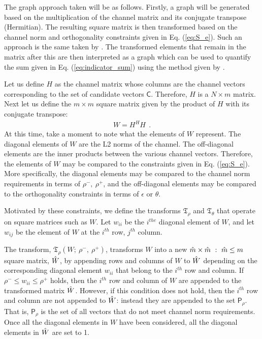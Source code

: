 The graph approach taken will be as follows. Firstly, a graph will be generated based on the multiplication of the channel matrix and its conjugate transpose (Hermitian). The resulting square matrix is then transformed based on the channel norm and orthogonality constraints given in Eq. (\ref{eq:S_e}). Such an approach is the same taken by \cite{SwannackThesis}. The transformed elements that remain in the matrix after this are then interpreted as a graph which can be used to quantify the sum given in Eq. (\ref{eq:indicator_sum}) using the method given by \cite{Janson2004}.

Let us define $H$ as the channel matrix whose columns are the channel vectors corresponding to the set of candidate vectors $\mathsf{C}$. Therefore, $H$ is a $N \times m$ matrix. Next let us define the $m \times m$ square matrix given by the product of $H$ with its conjugate transpose:
 \begin{equation}\label{eq:w_matrix}
    \begin{aligned}
        W = H^HH \ \ .
    \end{aligned}
\end{equation}
At this time, take a moment to note what the elements of $W$ represent. The diagonal elements of $W$ are the L2 norms of the channel. The off-diagonal elements are the inner products between the various channel vectors. Therefore, the elements of $W$ may be compared to the constraints given in Eq. (\ref{eq:S_e}). More specifically, the diagonal elements may be compared to the channel norm requirements in terms of $\rho^-,\ \rho^+$, and the off-diagonal elements may be compared to the orthogonality constraints in terms of $\epsilon$ or $\theta$.

Motivated by these constraints, we define the transforms $\mathfrak{T}_\rho$ and $\mathfrak{T}_\theta$ that operate on square matrices such as $W$. Let $w_{ii}$ be the $i^{the}$ diagonal element of $W$, and let $w_{ij}$ be the element of $W$ at the $i^{th}$ row, $j^{th}$ column.

The transform, $\mathfrak{T}_\rho(W;\ \rho^-, \ \rho^+)$, transforms $W$ into a new $\Hat{m}\times \Hat{m}\ : \ \Hat{m}\leq m$ square matrix, $\Hat{W}$, by appending rows and columns of $W$ to $\Hat{W}$ depending on the corresponding diagonal element $w_{ii}$ that belong to the $i^{th}$ row and column. If $\rho^- \leq w_{ii}\leq \rho^+$ holds, then the $i^{th}$ row and column of $W$ are appended to the transformed matrix $\Hat{W}$. However, if this condition does not hold, then the $i^{th}$ row and column are not appended to $\Hat{W}$: instead they are appended to the set $\mathsf{P}_\rho$. That is, $\mathsf{P}_\rho$ is the set of all vectors that do not meet channel norm requirements. Once all the diagonal elements in $W$ have been considered, all the diagonal elements in $\Hat{W}$ are set to 1.

